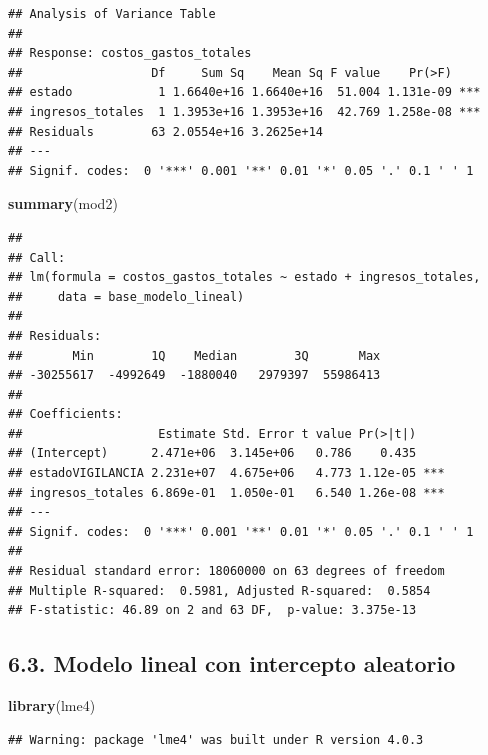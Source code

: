 \documentclass[
  11pt,
]{book}
\newenvironment{Shaded}{\begin{snugshade}}{\end{snugshade}}
\newcommand{\KeywordTok}[1]{\textcolor[rgb]{0.13,0.29,0.53}{\textbf{#1}}}
\newcommand{\NormalTok}[1]{#1}
\begin{document}
\begin{verbatim}
## Analysis of Variance Table
## 
## Response: costos_gastos_totales
##                  Df     Sum Sq    Mean Sq F value    Pr(>F)    
## estado            1 1.6640e+16 1.6640e+16  51.004 1.131e-09 ***
## ingresos_totales  1 1.3953e+16 1.3953e+16  42.769 1.258e-08 ***
## Residuals        63 2.0554e+16 3.2625e+14                      
## ---
## Signif. codes:  0 '***' 0.001 '**' 0.01 '*' 0.05 '.' 0.1 ' ' 1
\end{verbatim}

\begin{Shaded}
\begin{Highlighting}[]
\KeywordTok{summary}\NormalTok{(mod2)}
\end{Highlighting}
\end{Shaded}

\begin{verbatim}
## 
## Call:
## lm(formula = costos_gastos_totales ~ estado + ingresos_totales, 
##     data = base_modelo_lineal)
## 
## Residuals:
##       Min        1Q    Median        3Q       Max 
## -30255617  -4992649  -1880040   2979397  55986413 
## 
## Coefficients:
##                   Estimate Std. Error t value Pr(>|t|)    
## (Intercept)      2.471e+06  3.145e+06   0.786    0.435    
## estadoVIGILANCIA 2.231e+07  4.675e+06   4.773 1.12e-05 ***
## ingresos_totales 6.869e-01  1.050e-01   6.540 1.26e-08 ***
## ---
## Signif. codes:  0 '***' 0.001 '**' 0.01 '*' 0.05 '.' 0.1 ' ' 1
## 
## Residual standard error: 18060000 on 63 degrees of freedom
## Multiple R-squared:  0.5981, Adjusted R-squared:  0.5854 
## F-statistic: 46.89 on 2 and 63 DF,  p-value: 3.375e-13
\end{verbatim}

\hypertarget{modelo-lineal-con-intercepto-aleatorio}{%
\subsection{6.3. Modelo lineal con intercepto
aleatorio}\label{modelo-lineal-con-intercepto-aleatorio}}

\begin{Shaded}
\begin{Highlighting}[]
\KeywordTok{library}\NormalTok{(lme4)}
\end{Highlighting}
\end{Shaded}

\begin{verbatim}
## Warning: package 'lme4' was built under R version 4.0.3
\end{verbatim}
\end{document}
